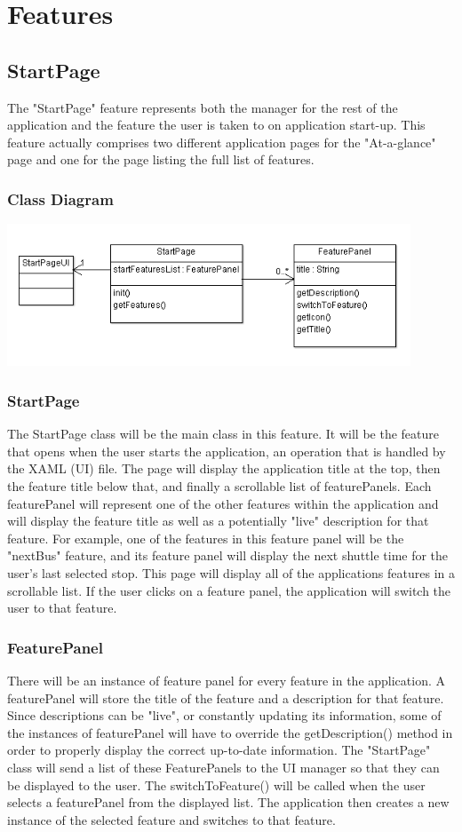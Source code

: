 \documentclass[pdftex,12pt,letter]{article}
\begin{document}
\section{Features}
\subsection{StartPage}
The "StartPage" feature represents both the manager for the rest of the application and the feature the user is taken to on application start-up. This feature actually comprises two different application pages for the "At-a-glance" page and one for the page listing the full list of features.
\subsubsection{Class Diagram}
\includegraphics[width=120mm]{StartPageCD.png}
\subsubsection{StartPage}
The StartPage class will be the main class in this feature. It will be the feature that opens when the user starts the application, an operation that is handled by the XAML (UI) file. The page will display the application title at the top, then the feature title below that, and finally a scrollable list of featurePanels. Each featurePanel will represent one of the other features within the application and will display the feature title as well as a potentially "live" description for that feature. For example, one of the features in this feature panel will be the "nextBus" feature, and its feature panel will display the next shuttle time for the user's last selected stop. This page will display all of the applications features in a scrollable list. If the user clicks on a feature panel, the application will switch the user to that feature.
\subsubsection{FeaturePanel}
There will be an instance of feature panel for every feature in the application. A featurePanel will store the title of the feature and a description for that feature. Since descriptions can be "live", or constantly updating its information, some of the instances of featurePanel will have to override the getDescription() method in order to properly display the correct up-to-date information. The "StartPage" class will send a list of these FeaturePanels to the UI manager so that they can be displayed to the user. The switchToFeature() will be called when the user selects a featurePanel from the displayed list. The application then creates a new instance of the selected feature and switches to that feature.
\end{document}
